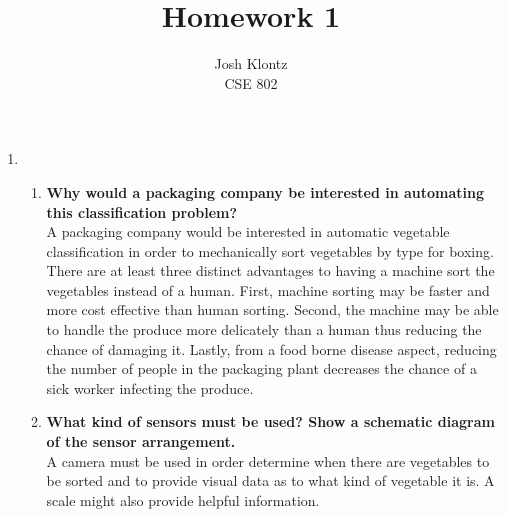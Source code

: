 \documentclass[12pt]{article}
\begin{document}
 
 
\title{Homework 1}%
\author{Josh Klontz\\ %
CSE 802} %
 
\maketitle
\begin{enumerate}
\item
  \begin{enumerate}
  \item \textbf{Why would a packaging company be interested in automating this classification problem?} \\
    A packaging company would be interested in automatic vegetable classification in order to mechanically sort vegetables by type for boxing.
    There are at least three distinct advantages to having a machine sort the vegetables instead of a human.
    First, machine sorting may be faster and more cost effective than human sorting.
    Second, the machine may be able to handle the produce more delicately than a human thus reducing the chance of damaging it.
    Lastly, from a food borne disease aspect, reducing the number of people in the packaging plant decreases the chance of a sick worker infecting the produce.
  \item \textbf{What kind of sensors must be used? Show a schematic diagram of the sensor arrangement.} \\
    A camera must be used in order determine when there are vegetables to be sorted and to provide visual data as to what kind of vegetable it is.
    A scale might also provide helpful information. \\
    \begin{figure}[h]
    \centering
    \small
\end{figure}
\end{enumerate}
\end{enumerate}
\end{document}
